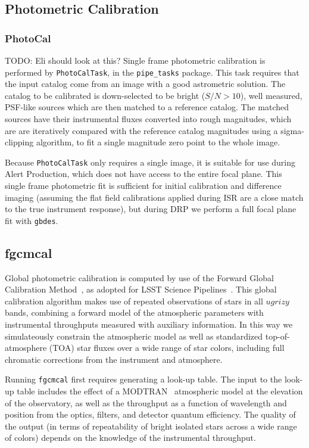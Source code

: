 \subsection{Photometric Calibration}
\label{sec:Photometric Calibration}

\subsubsection{PhotoCal}
\label{sec:PhotoCal}

TODO: Eli should look at this?
Single frame photometric calibration is performed by \texttt{PhotoCalTask}, in the \texttt{pipe\_tasks} package.
This task requires that the input catalog come from an image with a good astrometric solution.
The catalog to be calibrated is down-selected to be bright ($S/N>10$), well measured, PSF-like sources which are then matched to a reference catalog.
The matched sources have their instrumental fluxes converted into rough magnitudes, which are are iteratively compared with the reference catalog magnitudes using a sigma-clipping algorithm, to fit a single magnitude zero point to the whole image.

Because \texttt{PhotoCalTask} only requires a single image, it is suitable for use during Alert Production, which does not have access to the entire focal plane.
This single frame photometric fit is sufficient for initial calibration and difference imaging (assuming the flat field calibrations applied during ISR are a close match to the true instrument response), but during DRP we perform a full focal plane fit with \texttt{gbdes}.

\subsection{fgcmcal}
\label{sec:fgcmcal}

Global photometric calibration is computed by use of the Forward Global Calibration Method~\citep[FGCM][]{2018AJ....155...41B}, as adopted for LSST Science Pipelines~\citep{SITCOMTN-086}.
This global calibration algorithm makes use of repeated observations of stars in all $ugrizy$ bands, combining a forward model of the atmospheric parameters with instrumental throughputs measured with auxiliary information.
In this way we simulateously constrain the atmospheric model as well as standardized top-of-atmosphere (TOA) star fluxes over a wide range of star colors, including full chromatic corrections from the instrument and atmosphere.

Running \texttt{fgcmcal} first requires generating a look-up table.
The input to the look-up table includes the effect of a MODTRAN~\citep{10.1117/12.366388} atmospheric model at the elevation of the observatory, as well as the throughput as a function of wavelength and position from the optics, filters, and detector quantum efficiency.
The quality of the output (in terms of repeatability of bright isolated stars across a wide range of colors) depends on the knowledge of the instrumental throughput.

